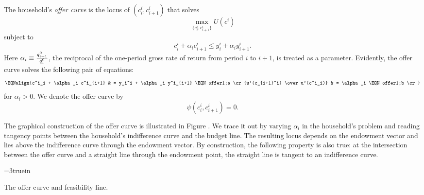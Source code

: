 \medskip
{}  The household's {\it offer curve} is
the locus of $(c_i^i, c^i_{i+1})$ that solves
$$ \max_{\{c_i^i, c^i_{i+1}\}} U(c^i)  $$
subject to
$$ c_i^i + \alpha_i c_{i+1}^i \leq y_i^i + \alpha_i y^i_{i+1} .$$
Here $\alpha_i \equiv {q^0_{i+1}\over q^0_i } $,
 the reciprocal
of the one-period gross rate of return from period $i$ to $i+1$, is treated
as a parameter.
\medskip
Evidently,
 the offer curve solves the following pair of equations:
$$\EQNalign{c^i_i + \alpha_i c^i_{i+1} & = y_i^i + \alpha_i y^i_{i+1} \EQN offer1;a
            \cr
            {u'(c_{i+1}^i) \over u'(c^i_i)} & = \alpha_i  \EQN offer1;b  \cr}$$
for $\alpha_i > 0$.
We denote the offer curve   by
$$ \psi(c^i_i, c^i_{i+1}) = 0 .$$

The graphical construction of the offer curve is illustrated in Figure . %
We trace it out by varying $\alpha_i$ in the household's problem and
reading tangency points between the household's indifference
curve and the budget line.  The resulting locus depends
on the endowment vector and  lies above the indifference curve through
the endowment vector.  By construction, the following property
is also true:  at the intersection between the offer curve and a straight
line through the endowment point, the straight line is tangent to an
indifference curve.



\centerline{\epsfxsize=3truein}
\caption{The offer curve and feasibility line.}
\endfigure

